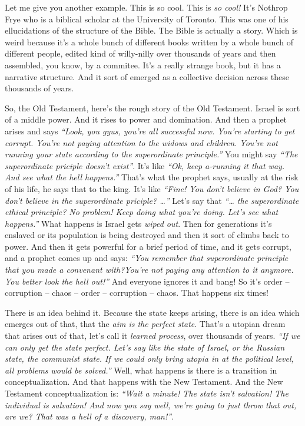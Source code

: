 \documentclass{memoir}
\newcommand{\qq}[1]{\emph{“#1”}}
\begin{document}
\begin{drama}
		\jpspeaks Let me give you another example. This is so cool. This is \emph{so cool!} It’s Nothrop Frye who is a biblical scholar at the University of Toronto. This was one of his ellucidations of the structure of the Bible. The Bible is actually a story. Which is weird because it’s a whole bunch of different books written by a whole bunch of different people, edited kind of willy-nilly over thousands of years and then assembled, you know, by a commitee. It’s a really strange book, but it has a narrative structure. And it sort of emerged as a collective decision across these thousands of years.

		So, the Old Testament, here’s the rough story of the Old Testament. Israel is sort of a middle power. And it rises to power and domination. And then a prophet arises and says \qq{Look, you gyus, you’re all successful now. You’re starting to get corrupt. You’re not paying attention to the widows and children. You’re not running your state according to the superordinate principle.} You might say \qq{The superordinate priciple doesn’t exist}. It’s like \qq{Ok, keep a-running it that way. And see what the hell happens.} That’s what the prophet says, usually at the risk of his life, he says that to the king. It’s like \qq{Fine! You don’t believe in God? You don’t believe in the superordinate priciple? \ldots{}} Let’s say that \qq{\ldots{} the superordinate ethical principle? No problem! Keep doing what you’re doing. Let’s see what happens.} What happens is Israel gets \emph{wiped out}. Then for generations it’s enslaved or its population is being destroyed and then it sort of climbs back to power. And then it gets powerful for a brief period of time, and it gets corrupt, and a prophet comes up and says: \qq{You remember that superordinate principle that you made a convenant with?You’re not paying any attention to it anymore. You better look the hell out!} And everyone ignores it and bang! So it’s order -- corruption -- chaos -- order -- corruption -- chaos. That happens six times!

There is an idea behind it. Because the state keeps arising, there is an idea which emerges out of that, that the \emph{aim is the perfect state}. That’s a utopian dream that arises out of that, let’s call it \emph{learned process}, over thousands of years. \qq{If we can only get the state perfect. Let’s say like the state of Israel, or the Russian state, the communist state. If we could only bring utopia in at the political level, all problems would be solved.} Well, what happens is there is a transition in conceptualization. And that happens with the New Testament. And the New Testament conceptualization is: \qq{Wait a minute! The state isn’t salvation! The individual is salvation! And now you say well, we’re going to just throw that out, are we? That was a hell of a discovery, man!}.


\end{drama}
\end{document}

